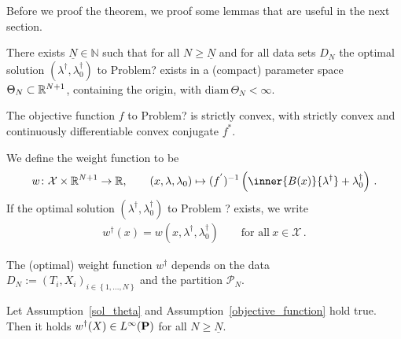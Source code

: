 Before we proof the theorem, we proof some lemmas that are useful in the next section.


\begin{assumption}
  \label{sol_theta}
  There exists $\underline{N}\in\mathbb{N}$ such that 
  for all $N\ge \underline{N}$ and for all data sets $D_N$
  the optimal solution
  $(\lambda^\dagger,\lambda_0^\dagger)$
  to Problem? exists in a (compact) parameter space 
  $\Theta_N\subset \R^{N+1}$, containing the origin, with
  $\mathrm{diam}\,\Theta_N<\infty$.
\end{assumption}

\begin{assumption}
  \label{objective_function}
  The objective function $f$ to Problem? is strictly convex, with strictly convex and continuously differentiable convex conjugate $f^*$. 
\end{assumption}
\begin{definition}
  We define the weight function to be
\begin{gather*}
  w
  \colon
  \mathcal{X}
  \times
  \R^{N+1}
  \to
  \R
  ,\qquad
  \left( 
  x
  ,
  \lambda
  ,
  \lambda_0
  \right)
  \mapsto
    (
    f^{'}
    )^{-1}
    \left( 
      \inner{B(x)}{\lambda^\dagger}
      +
      \lambda_0^\dagger
    \right)
    \,.
\end{gather*}
If 
  the optimal solution
  $(\lambda^\dagger,\lambda_0^\dagger)$
  to Problem ? exists, we write
  \begin{gather*}
    w^\dagger(x)
    =
    w(x,\lambda^\dagger,\lambda^\dagger_0)
    \qquad
    \text{for all}\ 
    x\in\mathcal{X}\,.
  \end{gather*}
\end{definition}
\begin{remark}
  The (optimal) weight function $w^\dagger$ depends on the data
  $D_N:=
  (T_i,X_i)_{i\in \left\{ 1,\ldots,N \right\}}$
  and the partition $\mathcal{P}_N$.
\end{remark}
\begin{lemma}
  \label{weights_bounded}
  Let Assumption~\ref{sol_theta} and Assumption~\ref{objective_function} hold true.
  Then it holds 
  $
  w^\dagger(X)\in L^\infty(\P)
  $ for all $N\ge \underline{N}$.
\end{lemma}

